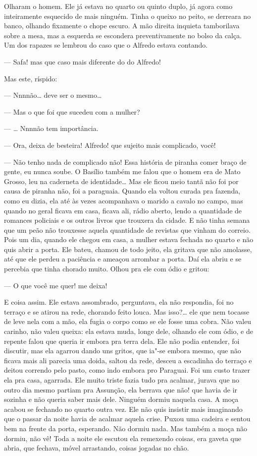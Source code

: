 \begin{linenumbers}
Olharam o homem. Ele já estava no quarto ou quinto duplo, já agora como
inteiramente esquecido de mais ninguém. Tinha o queixo no peito, se
derreara no banco, olhando fixamente o chope escuro. A mão direita
inquieta tamborilava sobre a mesa, mas a esquerda se escondera
preventivamente no bolso da calça. Um dos rapazes se lembrou do caso que
o Alfredo estava contando.

--- Safa! mas que caso mais diferente do do Alfredo!

Mas este, ríspido:

--- Nnnnão\ldots{} deve ser o mesmo\ldots{}

--- Mas o que foi que sucedeu com a mulher?

--- \ldots{} Nnnnão tem importância.

--- Ora, deixa de besteira! Alfredo! que sujeito mais complicado, você!

--- Não tenho nada de complicado não! Essa história de piranha comer
braço de gente, eu nunca soube. O Basílio também me falou que o homem
era de Mato Grosso, leu na caderneta de identidade\ldots{} Mas ele ficou meio
tantã não foi por causa de piranha não, foi a paraguaia. Quando ela
voltou curada pra fazenda, como eu dizia, ela até às vezes acompanhava o
marido a cavalo no campo, mas quando no geral ficava em casa, ficava
ali, rádio aberto, lendo a quantidade de romances policiais e os outros
livros que trouxera da cidade. E não tinha semana que um peão não
trouxesse aquela quantidade de revistas que vinham do correio. Pois um
dia, quando ele chegou em casa, a mulher estava fechada no quarto e não
quis abrir a porta. Ele bateu, chamou de todo jeito, ela gritava que não
amolasse, até que ele perdeu a paciência e ameaçou arrombar a porta. Daí
ela abriu e se percebia que tinha chorado muito. Olhou pra ele com ódio
e gritou:

--- O que você me quer! me deixa!

E coisa assim. Ele estava assombrado, perguntava, ela não respondia, foi
no terraço e se atirou na rede, chorando feito louca. Mas isso?\ldots{} ele
que nem tocasse de leve nela com a mão, ela fugia o corpo como se ele
fosse uma cobra. Não valeu carinho, não valeu queixa: ela estava muda,
longe dele, olhando ele com ódio, e de repente falou que queria ir
embora pra terra dela. Ele não podia entender, foi discutir, mas ela
agarrou dando uns gritos, que ia"-se embora mesmo, que não ficava mais
ali parecia uma doida, saltou da rede, desceu a escadinha do terraço e
deitou correndo pelo pasto, como indo embora pro Paraguai. Foi um custo
trazer ela pra casa, agarrada. Ele muito triste fazia tudo pra acalmar,
jurava que no outro dia mesmo partiam pra Assunção, ela berrava que não!
que havia de ir sozinha e não queria saber mais dele. Ninguém dormiu
naquela casa. A moça acabou se fechando no quarto outra vez. Ele não
quis insistir mais imaginando que o passar da noite havia de acalmar
aquela crise. Puxou uma cadeira e sentou bem na frente da porta,
esperando. Não dormiu nada. Mas também a moça não dormiu, não vê! Toda a
noite ele escutou ela remexendo coisas, era gaveta que abria, que
fechava, móvel arrastando, coisas jogadas no chão.


\end{linenumbers}
